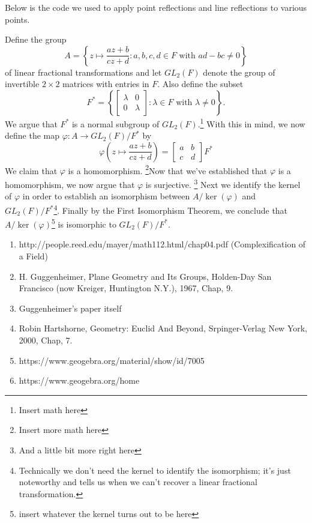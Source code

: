 \documentclass[12pt]{article}
\newcommand{\lftmat}[4]{\begin{bmatrix} {#1} & {#2} \\ {#3} & {#4} \end{bmatrix}}
\newcommand{\stanlftmat}{\lftmat{a}{b}{c}{d}}
\theoremstyle{plain}
\theoremstyle{definition}
\begin{document}
\begin{appendices}
Below is the code we used to apply point reflections and line reflections to various points. 








\newpage
{}

\noindent Define the group
	\[
		A = \left\lbrace z\mapsto \frac{az + b}{cz + d}\colon a,b,c,d\in F\text{ with } ad - bc \neq 0\right\rbrace
	\]
of linear fractional transformations and let $GL_2(F)$ denote the group of invertible $2\times 2$ matrices with entries in $F$. Also define the subset
	\[
		F^* = \left\lbrace\lftmat{\lambda}{0}{0}{\lambda}\colon \lambda\in F\text{ with } \lambda\neq 0 \right\rbrace.
	\]
	We argue that $F^*$ is a normal subgroup of $GL_2(F)$.\footnote{Insert math here} With this in mind, we now define the map $\varphi\colon A\rightarrow GL_2(F)/F^*$ by
	\[
		\varphi\left(z\mapsto \frac{az + b}{cz + d}\right) = \stanlftmat F^*
	\]
	We claim that $\varphi$ is a homomorphism. \footnote{Insert more math here}Now that we've established that $\varphi$ is a homomorphism, we now argue that $\varphi$ is surjective. \footnote{And a little bit more right here}  Next we identify the kernel of $\varphi$ in order to establish an isomorphism between $A/\ker(\varphi)$ and $GL_2(F)/F^*$\footnote{Technically we don't need the kernel to identify the isomorphism; it's just noteworthy and tells us when we can't recover a linear fractional transformation.}. Finally by the First Isomorphism Theorem, we conclude that $A/\ker(\varphi)$\footnote{insert whatever the kernel turns out to be here} is isomorphic to $GL_2(F)/F^*$. 

	


\end{appendices}






\newpage
{} 

\begin{enumerate}
	\item http://people.reed.edu/mayer/math112.html/chap04.pdf (Complexification of a Field)
	\item H. Guggenheimer, Plane Geometry and Its Groups, Holden-Day San Francisco (now Kreiger, Huntington N.Y.), 1967, Chap, 9.
	\item Guggenheimer's paper itself
	\item Robin Hartshorne, Geometry: Euclid And Beyond, Srpinger-Verlag New York, 2000, Chap, 7.
	\item https://www.geogebra.org/material/show/id/7005
	\item https://www.geogebra.org/home
\end{enumerate}
\end{document}
